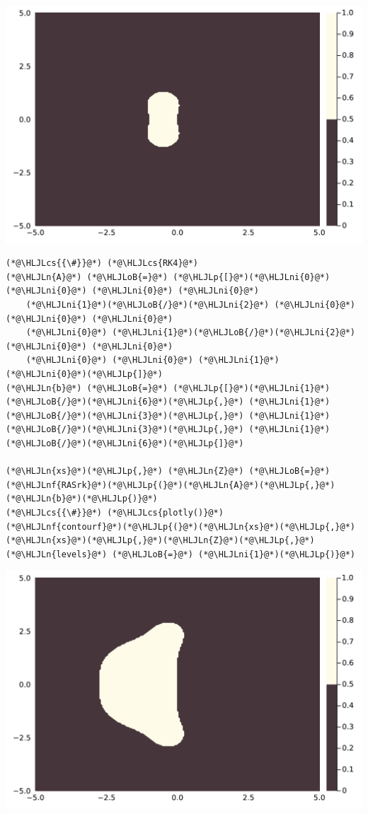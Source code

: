 \documentclass[12pt,a4paper]{article}
\newcommand{\HLJLn}[1]{#1}
\newcommand{\HLJLnf}[1]{\textcolor[RGB]{66,102,213}{#1}}
\newcommand{\HLJLni}[1]{\textcolor[RGB]{59,151,46}{#1}}
\newcommand{\HLJLoB}[1]{\textcolor[RGB]{102,102,102}{\textbf{#1}}}
\newcommand{\HLJLp}[1]{#1}
\newcommand{\HLJLcs}[1]{\textcolor[RGB]{153,153,119}{\textit{#1}}}
\begin{document}
\includegraphics[width=\linewidth]{figures/ass_3_report_2_1.pdf}

\begin{lstlisting}
(*@\HLJLcs{{\#}}@*) (*@\HLJLcs{RK4}@*)
(*@\HLJLn{A}@*) (*@\HLJLoB{=}@*) (*@\HLJLp{[}@*)(*@\HLJLni{0}@*) (*@\HLJLni{0}@*) (*@\HLJLni{0}@*) (*@\HLJLni{0}@*)
    (*@\HLJLni{1}@*)(*@\HLJLoB{/}@*)(*@\HLJLni{2}@*) (*@\HLJLni{0}@*) (*@\HLJLni{0}@*) (*@\HLJLni{0}@*)
    (*@\HLJLni{0}@*) (*@\HLJLni{1}@*)(*@\HLJLoB{/}@*)(*@\HLJLni{2}@*) (*@\HLJLni{0}@*) (*@\HLJLni{0}@*)
    (*@\HLJLni{0}@*) (*@\HLJLni{0}@*) (*@\HLJLni{1}@*) (*@\HLJLni{0}@*)(*@\HLJLp{]}@*)
(*@\HLJLn{b}@*) (*@\HLJLoB{=}@*) (*@\HLJLp{[}@*)(*@\HLJLni{1}@*)(*@\HLJLoB{/}@*)(*@\HLJLni{6}@*)(*@\HLJLp{,}@*) (*@\HLJLni{1}@*)(*@\HLJLoB{/}@*)(*@\HLJLni{3}@*)(*@\HLJLp{,}@*) (*@\HLJLni{1}@*)(*@\HLJLoB{/}@*)(*@\HLJLni{3}@*)(*@\HLJLp{,}@*) (*@\HLJLni{1}@*)(*@\HLJLoB{/}@*)(*@\HLJLni{6}@*)(*@\HLJLp{]}@*)

(*@\HLJLn{xs}@*)(*@\HLJLp{,}@*) (*@\HLJLn{Z}@*) (*@\HLJLoB{=}@*) (*@\HLJLnf{RASrk}@*)(*@\HLJLp{(}@*)(*@\HLJLn{A}@*)(*@\HLJLp{,}@*)(*@\HLJLn{b}@*)(*@\HLJLp{)}@*)
(*@\HLJLcs{{\#}}@*) (*@\HLJLcs{plotly()}@*)
(*@\HLJLnf{contourf}@*)(*@\HLJLp{(}@*)(*@\HLJLn{xs}@*)(*@\HLJLp{,}@*)(*@\HLJLn{xs}@*)(*@\HLJLp{,}@*)(*@\HLJLn{Z}@*)(*@\HLJLp{,}@*) (*@\HLJLn{levels}@*) (*@\HLJLoB{=}@*) (*@\HLJLni{1}@*)(*@\HLJLp{)}@*)
\end{lstlisting}

\includegraphics[width=\linewidth]{figures/ass_3_report_3_1.pdf}
\end{document}
